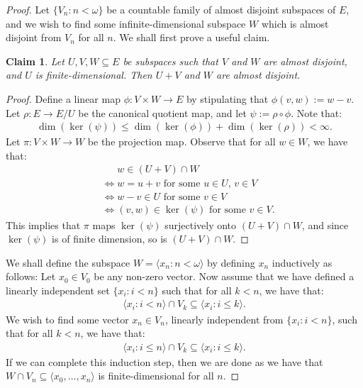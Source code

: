 \documentclass[11pt,reqno]{amsart}
\theoremstyle{plain}
\numberwithin{equation}{section}
\newtheorem{claim}{Claim}
\theoremstyle{definition}
\renewcommand{\c}[1]{\langle #1 \rangle}
\newcommand{\iffbreak}{\phantom{{} \iff {}}}
\newenvironment{midproof}[1][Proof]
  {\begin{proof}[#1]\renewcommand{\qedsymbol}{$\blacksquare$}}
  {\end{proof}}
\begin{document}
\begin{proof}
    Let $\{V_n : n < \omega\}$ be a countable family of almost disjoint subspaces of $E$, and we wish to find some infinite-dimensional subspace $W$ which is almost disjoint from $V_n$ for all $n$. We shall first prove a useful claim.

    \begin{claim}
    \label{claim:finite-dimensional.addition}
        Let $U,V,W \subseteq E$ be subspaces such that $V$ and $W$ are almost disjoint, and $U$ is finite-dimensional. Then $U + V$ and $W$ are almost disjoint.
    \end{claim}

    \begin{midproof}
        Define a linear map $\phi : V \times W \to E$ by stipulating that $\phi(v,w) := w - v$. Let $\rho : E \to E/U$ be the canonical quotient map, and let $\psi := \rho \circ \phi$. Note that:
        \begin{align*}
            \dim(\ker(\psi)) \leq \dim(\ker(\phi)) + \dim(\ker(\rho)) < \infty.
        \end{align*}    
        Let $\pi : V \times W \to W$ be the projection map. Observe that for all $w \in W$, we have that:
        \begin{align*}
            &\iffbreak w \in (U + V) \cap W \\
            &\iff w = u + v \text{ for some $u \in U$, $v \in V$} \\
            &\iff w - v \in U \text{ for some $v \in V$} \\
            &\iff (v,w) \in \ker(\psi) \text{ for some $v \in V$}.
        \end{align*}
        This implies that $\pi$ maps $\ker(\psi)$ surjectively onto $(U + V) \cap W$, and since $\ker(\psi)$ is of finite dimension, so is $(U + V) \cap W$.
    \end{midproof}

    We shall define the subspace $W = \c{x_n : n < \omega}$ by defining $x_n$ inductively as follows: Let $x_0 \in V_0$ be any non-zero vector. Now assume that we have defined a linearly independent set $\{x_i : i < n\}$ such that for all $k < n$, we have that:
    \begin{align*}
        \c{x_i : i < n} \cap V_k \subseteq \c{x_i : i \leq k}.
    \end{align*}
    We wish to find some vector $x_n \in V_n$, linearly independent from $\{x_i : i < n\}$, such that for all $k < n$, we have that:
    \begin{align*}
        \c{x_i : i \leq n} \cap V_k \subseteq \c{x_i : i \leq k}.
    \end{align*}
    If we can complete this induction step, then we are done as we have that $W \cap V_n \subseteq \c{x_0,\dots,x_n}$ is finite-dimensional for all $n$.
    

\end{proof}
\end{document}
